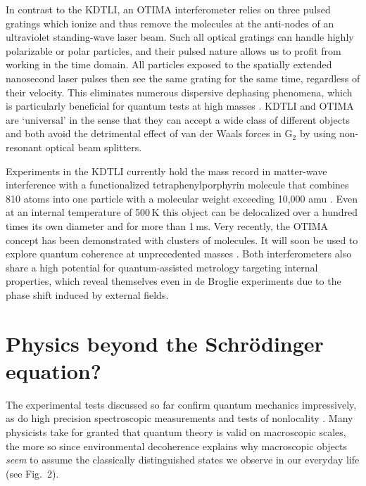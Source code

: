 \documentclass[11pt]{article}
\begin{document}
In contrast to the KDTLI, an OTIMA interferometer relies on three  pulsed  gratings which 
ionize and thus remove the molecules  at the anti-nodes of an ultraviolet standing-wave laser beam\cite{reiger2006exploration}. Such all optical gratings can handle highly polarizable or polar particles, and their pulsed nature 
allows us to profit from working in the time domain. All particles exposed to the spatially extended nanosecond 
laser pulses then see the same grating for the same time, regardless of their velocity. This eliminates numerous dispersive dephasing phenomena,
which is particularly beneficial for quantum tests at high masses \cite{Nimmrichter2011a_PRA_long,Nimmrichter2011b}.
KDTLI and OTIMA are `universal' 
in the sense that they can accept a wide class of different objects and
both avoid 
the detrimental effect of
van der Waals forces in G$_2$ by using non-resonant optical beam splitters.

Experiments in the KDTLI currently hold the mass record in matter-wave interference
with a functionalized tetraphenylporphyrin molecule that combines 810 atoms into one
particle with a molecular weight exceeding 10,000 amu \cite{Eibenberger2013}.
Even at an internal temperature of 500\,K this object can be 
delocalized over 
a hundred times its own diameter and for more than 1\,ms.
Very recently, the OTIMA concept has been demonstrated\cite{Haslinger2013} with clusters of molecules.
It will soon be used to explore quantum coherence at unprecedented masses \cite{Nimmrichter2011a_PRA_long}.
Both interferometers also share a high potential for quantum-assisted metrology targeting 
internal properties, which reveal themselves even in de Broglie experiments 
due to the phase shift induced by
external fields\cite{Berninger2007,Gerlich2008b,Tuexen2010}.

\section{Physics beyond the Schr\"odinger equation?}

The experimental tests discussed so far confirm quantum mechanics impressively, as do high precision spectroscopic measurements \cite{PhysRevLett.84.5496,PhysRevLett.97.030801} and tests of nonlocality \cite{freedman1972,aspect1982,giustina2013}. 
Many physicists take for granted that quantum theory is valid on macroscopic scales, the more so since environmental decoherence explains why macroscopic objects \emph{seem} to assume the classically distinguished states we observe in our everyday life\cite{Joos2003,Zurek2003} (see Fig.~2). 
\end{document}
